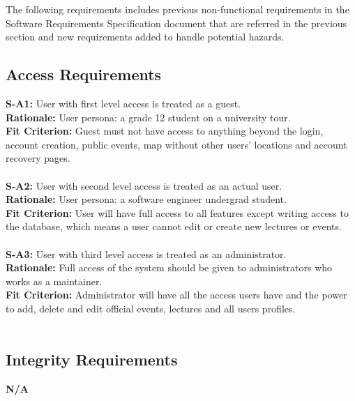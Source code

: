 \documentclass{article}
\begin{document}
The following requirements includes previous non-functional requirements in the Software Requirements Specification document that are referred in the previous section and new requirements added to handle potential hazards.

\subsection{Access Requirements}
\textbf{S-A1:} User with first level access is treated as a guest.\\
\textbf{Rationale:} User persona: a grade 12 student on a university tour.\\
\textbf{Fit Criterion:} Guest must not have access to anything beyond the login, account creation, public events, map without other users' locations and account recovery pages. \\\\
\textbf{S-A2:} User with second level access is treated as an actual user.\\
\textbf{Rationale:} User persona: a software engineer undergrad student.\\
\textbf{Fit Criterion:} User will have full access to all features except writing access to the database, which means a user cannot edit or create new lectures or events. \\\\
\textbf{S-A3:} User with third level access is treated as an administrator.\\
\textbf{Rationale:} Full access of the system should be given to administrators who works as a maintainer.\\
\textbf{Fit Criterion:} Administrator will have all the access users have and the power to add, delete and edit official events, lectures and all users profiles.\\\\

\subsection{Integrity Requirements}

\textbf{N/A}
\end{document}
